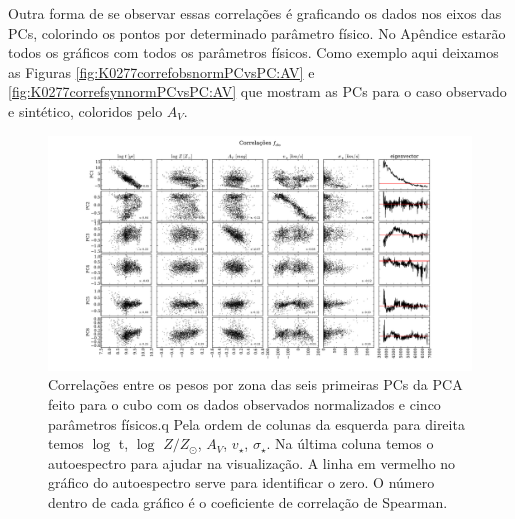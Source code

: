 Outra forma de se observar essas correlações é graficando os dados nos eixos das PCs, colorindo os pontos por
determinado parâmetro físico. No Apêndice estarão todos os gráficos com todos os parâmetros físicos. Como exemplo aqui
deixamos as Figuras \ref{fig:K0277correfobsnormPCvsPC:AV} e \ref{fig:K0277correfsynnormPCvsPC:AV} que mostram
as PCs para o caso observado e sintético, coloridos pelo $A_V$.

\begin{figure}
    \includegraphics[width=1.3\textwidth, angle=-90]{figuras/K0277-correl-f_obs_norm-PCvsPhys.pdf}
	\caption[Correlações PCs vs. par\^ametros f\'isicos - $F_{obs}$ norm.]
    {Correlações entre os pesos por zona das seis primeiras PCs da PCA feito para o cubo com os dados observados
    normalizados e cinco parâmetros físicos.q Pela ordem de colunas da esquerda para direita temos $\log$ t, $\log$ $Z /
    Z_{\odot}$, $A_V$, $v_{\star}$, $\sigma_{\star}$. Na última coluna temos o autoespectro para ajudar na visualização.
    A linha em vermelho no gráfico do autoespectro serve para identificar o zero. O número dentro de cada gráfico é o
    coeficiente de correlação de Spearman.}
    \label{fig:K0277correfobsnorm}
\end{figure}

